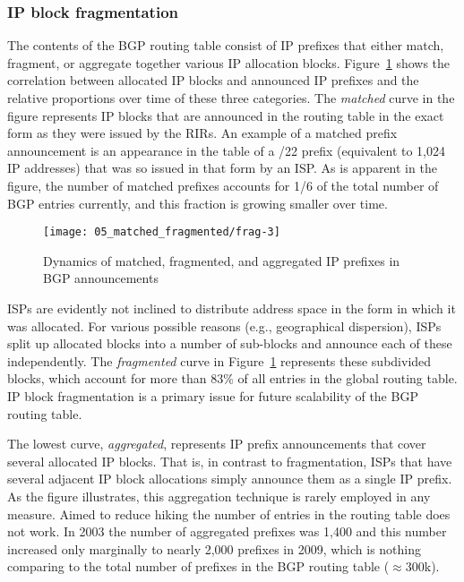 \subsubsection{IP block fragmentation}

The contents of the BGP routing table consist of IP prefixes that either match, fragment, or aggregate together various IP allocation blocks. Figure~\ref{fig:fragmentation} shows the correlation between allocated IP
blocks and announced IP prefixes and the relative proportions over time of these three categories. The \emph{matched} curve in the figure
represents IP blocks that are announced in the routing table in the exact form as they were
issued by the RIRs. An example of a matched prefix announcement is an appearance in the table of a /22 prefix (equivalent to 1,024 IP addresses) that was so issued in that form by an ISP. As is apparent in the figure,
the number of matched prefixes accounts for 1/6 of the total
number of BGP entries currently, and this fraction is growing smaller over time.

\begin{figure}[htbp]
	\centering
		\texttt{[image: 05\_matched\_fragmented/frag-3]}
	\caption{Dynamics of matched, fragmented, and aggregated IP prefixes in BGP announcements}
	\label{fig:fragmentation}
\end{figure}

ISPs are evidently not inclined to distribute address space in the form in which it was allocated. For various possible reasons (e.g.,
geographical dispersion), ISPs split up allocated blocks into a number of
sub-blocks and announce each of these independently. The \emph{fragmented}
curve in Figure~\ref{fig:fragmentation} represents these subdivided blocks,
which account for more than 83\% of all entries in the global routing table.
IP block fragmentation is a primary issue for future scalability of the BGP routing table.

The lowest curve, \emph{aggregated}, represents IP prefix announcements that
cover several allocated IP blocks. That is, in contrast to fragmentation,
ISPs that have several adjacent IP block allocations simply announce them as a single IP prefix. As the figure illustrates, this aggregation
technique is rarely employed in any measure.  Aimed to reduce hiking the number of entries in the routing table
does not work. In 2003 the number of aggregated prefixes was 1,400 and this
number increased only marginally to nearly 2,000 prefixes in 2009, which is
nothing comparing to the total number of prefixes in the BGP routing table
($\approx$300k).

